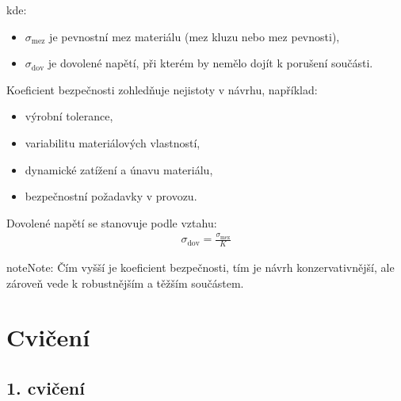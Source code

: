 \documentclass[letterpaper,10pt,english]{jupyterBook}
\begin{document}
{{\sphinxAtStartPar
kde:
\begin{itemize}
\item {} 
\sphinxAtStartPar
\(\sigma_{\text{mez}}\) je pevnostní mez materiálu (mez kluzu nebo mez pevnosti),

\item {} 
\sphinxAtStartPar
\(\sigma_{\text{dov}}\) je dovolené napětí, při kterém by nemělo dojít k porušení součásti.

\end{itemize}

\sphinxAtStartPar
Koeficient bezpečnosti zohledňuje nejistoty v návrhu, například:
\begin{itemize}
\item {} 
\sphinxAtStartPar
výrobní tolerance,

\item {} 
\sphinxAtStartPar
variabilitu materiálových vlastností,

\item {} 
\sphinxAtStartPar
dynamické zatížení a únavu materiálu,

\item {} 
\sphinxAtStartPar
bezpečnostní požadavky v provozu.

\end{itemize}

\sphinxAtStartPar
Dovolené napětí se stanovuje podle vztahu:
\begin{equation*}
\begin{split}
\sigma_{\text{dov}} = \frac{\sigma_{\text{mez}}}{K}
\end{split}
\end{equation*}
\begin{sphinxadmonition}{note}{Note:}
\sphinxAtStartPar
Čím vyšší je koeficient bezpečnosti, tím je návrh konzervativnější, ale zároveň vede k robustnějším a těžším součástem.
\end{sphinxadmonition}

\sphinxstepscope


\part{Cvičení}

\sphinxstepscope


\chapter{1. cvičení}
\label{\detokenize{Cviceni/C1:cviceni}}\label{\detokenize{Cviceni/C1::doc}}

}}
\end{document}
